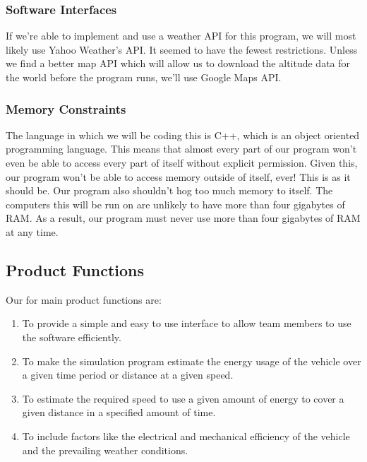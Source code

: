\documentclass[onecolumn, draftclsnofoot,10pt, compsoc]{IEEEtran}
\begin{document}
        \subsubsection{Software Interfaces} %
        If we're able to implement and use a weather API for this program, we will most likely use Yahoo Weather's API. It seemed to have the fewest restrictions.
        Unless we find a better map API which will allow us to download the altitude data for the world before the program runs, we'll use Google Maps API.
        
        \subsubsection{Memory Constraints}  %
        The language in which we will be coding this is C++, which is an object oriented programming language. This means that almost every part of our program won't even be able to access every part of itself without explicit permission. Given this, our program won't be able to access memory outside of itself, ever! This is as it should be. Our program also shouldn't hog too much memory to itself. The computers this will be run on are unlikely to have more than four gigabytes of RAM. As a result, our program must never use more than four gigabytes of RAM at any time.
    
    \subsection{Product Functions}          %
    Our for main product functions are: 
    \begin{enumerate}
        \item To provide a simple and easy to use interface to allow team members to use the software efficiently. 
        \item To make the simulation program estimate the energy usage of the vehicle over a given time period or distance at a given speed.
        \item To estimate the required speed to use a given amount of energy to cover a given distance in a specified amount of time. 
        \item To include factors like the electrical and mechanical efficiency of the vehicle and the prevailing weather conditions. 
    \end{enumerate}
    
\end{document}
